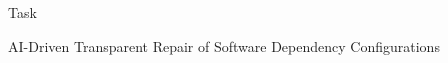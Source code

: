 \vspace*{0pt plus 1fill}
\begin{tucsimplesection}[2\bigskipamount]{Task}
\begin{center}
\LARGE AI-Driven Transparent Repair of Software Dependency Configurations
\end{center}

\bigskip

\end{tucsimplesection}
\vspace*{0pt plus 2.5fill}
